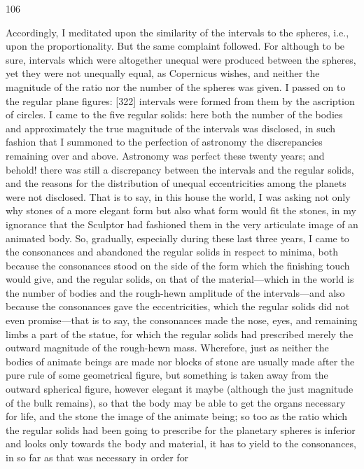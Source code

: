 \documentclass{article}
\begin{document}
106

Accordingly, I meditated upon the similarity of the intervals to the
spheres, i.e., upon the proportionality. But the same complaint followed.
For although to be sure, intervals which were altogether unequal were
produced between the spheres, yet they were not unequally equal, as
Copernicus wishes, and neither the magnitude of the ratio nor the
number of the spheres was given. I passed on to the regular plane
figures: [322] intervals were formed from them by the ascription of
circles. I came to the five regular solids: here both the number of the
bodies and approximately the true magnitude of the intervals was
disclosed, in such fashion that I summoned to the perfection of
astronomy the discrepancies remaining over and above. Astronomy was
perfect these twenty years; and behold! there was still a discrepancy
between the intervals and the regular solids, and the reasons for the
distribution of unequal eccentricities among the planets were not
disclosed. That is to say, in this house the world, I was asking not only
why stones of a more elegant form but also what form would fit the
stones, in my ignorance that the Sculptor had fashioned them in the very
articulate image of an animated body. So, gradually, especially during
these last three years, I came to the consonances and abandoned the
regular solids in respect to minima, both because the consonances stood
on the side of the form which the finishing touch would give, and the
regular solids, on that of the material—which in the world is the number
of bodies and the rough-hewn amplitude of the intervals—and also
because the consonances gave the eccentricities, which the regular solids
did not even promise—that is to say, the consonances made the nose,
eyes, and remaining limbs a part of the statue, for which the regular
solids had prescribed merely the outward magnitude of the rough-hewn
mass.
Wherefore, just as neither the bodies of animate beings are made nor
blocks of stone are usually made after the pure rule of some geometrical
figure, but something is taken away from the outward spherical figure,
however elegant it maybe (although the just magnitude of the bulk
remains), so that the body may be able to get the organs necessary for
life, and the stone the image of the animate being; so too as the ratio
which the regular solids had been going to prescribe for the planetary
spheres is inferior and looks only towards the body and material, it has
to yield to the consonances, in so far as that was necessary in order for
\end{document}
